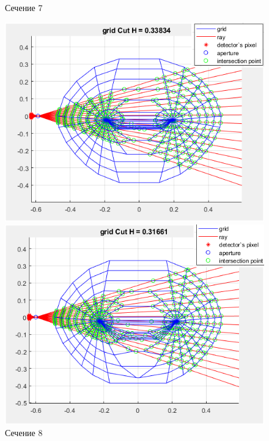 \documentclass[a4]{article}
\begin{document}
\begin{figure}[H]
\begin{center}
\caption{Сечение 7}
\includegraphics{pic12.png} 

\caption{Сечение 8}
\includegraphics{pic13.png} 
\end{center}
\end{figure}
\end{document}
